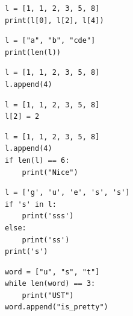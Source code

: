 \documentclass[dvipsnames, svgnames, x11names, handout]{beamer}
\begin{document}
\begin{frame}[fragile]{}
    \begin{center}
        \begin{verbatim}
            l = [1, 1, 2, 3, 5, 8]
            print(l[0], l[2], l[4])
        \end{verbatim}
    \end{center}
\end{frame}

\begin{frame}[fragile]{}
    \begin{center}
        \begin{verbatim}
            l = ["a", "b", "cde"]
            print(len(l))
        \end{verbatim}
    \end{center}
\end{frame}

\begin{frame}[fragile]{}
    \begin{center}
        \begin{verbatim}
            l = [1, 1, 2, 3, 5, 8]
            l.append(4)
        \end{verbatim}
    \end{center}
\end{frame}

\begin{frame}[fragile]{}
    \begin{center}
        \begin{verbatim}
            l = [1, 1, 2, 3, 5, 8]
            l[2] = 2
        \end{verbatim}
    \end{center}
\end{frame}

\begin{frame}[fragile]{}
    \begin{center}
        \begin{verbatim}
            l = [1, 1, 2, 3, 5, 8]
            l.append(4)
            if len(l) == 6:
                print("Nice")
        \end{verbatim}
    \end{center}
\end{frame}

\begin{frame}[fragile]{}
    \begin{center}
        \begin{verbatim}
            l = ['g', 'u', 'e', 's', 's']
            if 's' in l:
                print('sss')
            else:
                print('ss')
            print('s')
        \end{verbatim}
    \end{center}
\end{frame}

\begin{frame}[fragile]{}
    \begin{center}
        \begin{verbatim}
            word = ["u", "s", "t"]
            while len(word) == 3:
                print("UST")
            word.append("is_pretty")
        \end{verbatim}
    \end{center}
\end{frame}
\end{document}
